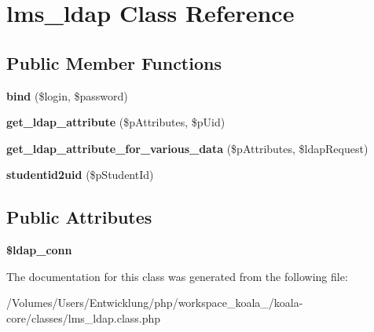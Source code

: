 \hypertarget{classlms__ldap}{
\section{lms\_\-ldap Class Reference}
\label{classlms__ldap}
}
\subsection*{Public Member Functions}
\begin{DoxyCompactItemize}
\item 
\hypertarget{classlms__ldap_a616c5fa6da2cf3701691e22f9f12e939}{
{\bfseries bind} (\$login, \$password)}
\label{classlms__ldap_a616c5fa6da2cf3701691e22f9f12e939}

\item 
\hypertarget{classlms__ldap_a875279bc66e469a98f9205246de8106d}{
{\bfseries get\_\-ldap\_\-attribute} (\$pAttributes, \$pUid)}
\label{classlms__ldap_a875279bc66e469a98f9205246de8106d}

\item 
\hypertarget{classlms__ldap_a7d8507e3a3770867e4d17880a25235ef}{
{\bfseries get\_\-ldap\_\-attribute\_\-for\_\-various\_\-data} (\$pAttributes, \$ldapRequest)}
\label{classlms__ldap_a7d8507e3a3770867e4d17880a25235ef}

\item 
\hypertarget{classlms__ldap_a2c9121e746b424692df596078cbca2ed}{
{\bfseries studentid2uid} (\$pStudentId)}
\label{classlms__ldap_a2c9121e746b424692df596078cbca2ed}

\end{DoxyCompactItemize}
\subsection*{Public Attributes}
\begin{DoxyCompactItemize}
\item 
\hypertarget{classlms__ldap_a67e8a60bec8a65c54e231017c901d8d4}{
{\bfseries \$ldap\_\-conn}}
\label{classlms__ldap_a67e8a60bec8a65c54e231017c901d8d4}

\end{DoxyCompactItemize}


The documentation for this class was generated from the following file:\begin{DoxyCompactItemize}
\item 
/Volumes/Users/Entwicklung/php/workspace\_\-koala\_/koala-\/core/classes/lms\_\-ldap.class.php\end{DoxyCompactItemize}
